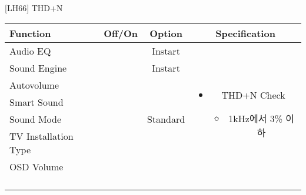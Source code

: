 \begin{frame}[t]{[LH66] THD+N}
\begin{tiny}
\begin{tabular}{@{}lccc@{}}
\toprule
Function & Off/On & Option & Specification \\
\midrule
Audio EQ & \color{black}{Off} & Instart &
\multirow{10}{60mm}{
\begin{itemize}
\item THD+N Check
	\begin{itemize}
	\item 1kHz에서 3\% 이하
	\end{itemize}
\end{itemize}
} \\
Sound Engine & \color{black}{Off} & Instart & \\
Autovolume & \color{black}{Off} & & \\
Smart Sound & \color{black}{Off} & & \\
Sound Mode & \color{blue}{On} & Standard & \\
TV Installation Type & \color{blue}{On} & \color{black}{Standtype1} & \\
OSD Volume & \color{blue}{On} & \color{blue}{Vol.100} & \\
& & & \\
& & & \\
& & & \\
& & & \\
\midrule
\end{tabular}
\end{tiny}

\end{frame}



